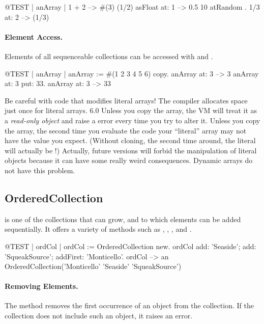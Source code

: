 \documentclass[a4paper,10pt,twoside]{book}
\begin{document}
\begin{code}{@TEST | anArray |}
{ 1 + 2 } --> #(3)
{(1/2) asFloat} at: 1 --> 0.5
{10 atRandom . 1/3} at: 2 --> (1/3)
\end{code}

\paragraph{Element Access.}
Elements of all sequenceable collections can be accessed with  and .

\begin{code}{@TEST | anArray |}
anArray := #(1 2 3 4 5 6) copy.
anArray at: 3 --> 3
anArray at: 3 put: 33.
anArray at: 3 --> 33
\end{code}

\noindent
Be careful with code that modifies literal arrays!
The compiler allocates space just once for literal arrays.
\SqVersionSwitch
{6.0}{
  Unless you copy the array, the VM will treat it as a \emph{read-only object} and raise a  error every time you try to alter it.
}{
  Unless you copy the array, the second time you evaluate the code your ``literal'' array may not have the value you expect.
  (Without cloning, the second time around, the literal  will actually be !)
  Actually, future \sq versions will forbid the manipulation of literal objects because it can have some really weird consequences.
}
Dynamic arrays do not have this problem.

\subsection{OrderedCollection}
 is one of the collections that can grow, and to which elements can be added sequentially.
It offers a variety of methods such as , , , and . 

\begin{code}{@TEST | ordCol |}
ordCol := OrderedCollection new.
ordCol add: 'Seaside'; add: 'SqueakSource'; addFirst: 'Monticello'.
ordCol --> an OrderedCollection('Monticello' 'Seaside' 'SqueakSource')
\end{code}

\paragraph{Removing Elements.}
The method   removes the first occurrence of an object from the collection.
If the collection does not include such an object, it raises an error. 
\end{document}
